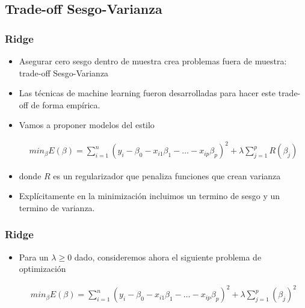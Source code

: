 \documentclass[
  shownotes,
  xcolor={svgnames},
  hyperref={colorlinks,citecolor=DarkBlue,linkcolor=andesred,urlcolor=DarkBlue}
  , aspectratio=169]{beamer}
\begin{document}
\subsection{Trade-off Sesgo-Varianza}
\begin{frame}[fragile]
\frametitle{Ridge}
  \begin{itemize}
    \item Asegurar cero sesgo dentro de muestra crea problemas fuera de muestra: trade-off Sesgo-Varianza
    \medskip
    \item Las técnicas de machine learning fueron desarrolladas para hacer este trade-off de forma empírica.
    \medskip
    \item Vamos a proponer modelos del estilo


\begin{align}
min_{\beta} E(\beta) = \sum_{i=1}^n (y_i-\beta_0 - x_{i1}\beta_1 - \dots - x_{ip}\beta_p)^2 + \lambda \sum_{j=1}^p R(\beta_j)
\end{align}

\item donde $R$ es un regularizador que penaliza funciones que crean varianza
\medskip
\item Explícitamente en la minimización incluimos un termino de sesgo y un termino de varianza.


  \end{itemize}
\end{frame}
\begin{frame}[fragile]
\frametitle{Ridge}

\begin{itemize}
\item Para un $\lambda \geq 0$ dado, consideremos ahora el siguiente problema de optimización


\begin{align}
min_{\beta} E(\beta) = \sum_{i=1}^n (y_i-\beta_0 - x_{i1}\beta_1 - \dots - x_{ip}\beta_p)^2 + \lambda \sum_{j=1}^p (\beta_j)^2
\end{align}



\end{itemize}


\end{frame}
\end{document}
